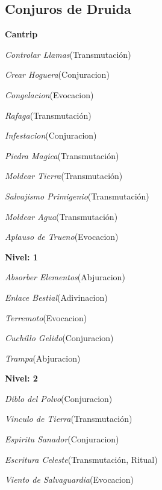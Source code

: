\documentclass[a4paper,twocolumn,openany,10pt]{dndbook}
\begin{document}
\subsection*{Conjuros de Druida}
\begin{list}{}{}
	\item \textbf{Cantrip}
	\begin{list}{}{}
		\item \textit{Controlar Llamas}(Transmutación)
		\item \textit{Crear Hoguera}(Conjuracion)
		\item \textit{Congelacion}(Evocacion)
		\item \textit{Rafaga}(Transmutación)
		\item \textit{Infestacion}(Conjuracion)
		\item \textit{Piedra Magica}(Transmutación)
		\item \textit{Moldear Tierra}(Transmutación)
		\item \textit{Salvajismo Primigenio}(Transmutación)
		\item \textit{Moldear Agua}(Transmutación)
		\item \textit{Aplauso de Trueno}(Evocacion)
	\end{list}

	\item \textbf{Nivel: 1}
	\begin{list}{}{}
		\item \textit{Absorber Elementos}(Abjuracion)
		\item \textit{Enlace Bestial}(Adivinacion)
		\item \textit{Terremoto}(Evocacion)
		\item \textit{Cuchillo Gelido}(Conjuracion)
		\item \textit{Trampa}(Abjuracion)
	\end{list}

	\item \textbf{Nivel: 2}
	\begin{list}{}{}
		\item \textit{Diblo del Polvo}(Conjuracion)
		\item \textit{Vinculo de Tierra}(Transmutación)
		\item \textit{Espiritu Sanador}(Conjuracion)
		\item \textit{Escritura Celeste}(Transmutación, Ritual)
		\item \textit{Viento de Salvaguardia}(Evocacion)
	\end{list}


\end{list}
\end{document}
